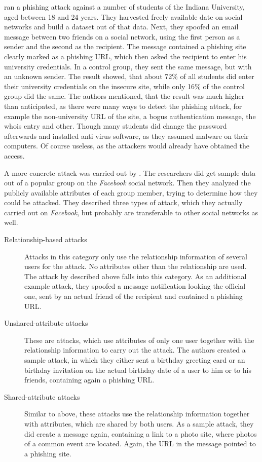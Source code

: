 \cite{jagatic2007} ran a phishing attack against a number of students of the
Indiana University, aged between 18 and 24 years. They harvested freely
available date on social networks and build a dataset out of that data. Next,
they spoofed an email message between two friends on a social network, using
the first person as a sender and the second as the recipient. The message
contained a phishing site clearly marked as a phishing URL, which then asked
the recipient to enter his university credentials. In a control group, they
sent the same message, but with an unknown sender. The result showed, that
about 72\% of all students did enter their university credentials on the
insecure site, while only 16\% of the control group did the same. The authors
mentioned, that the result was much higher than anticipated, as there were many
ways to detect the phishing attack, for example the non-university URL of the
site, a bogus authentication message, the whois entry and other. Though many
students did change the password afterwards and installed anti virus software,
as they assumed malware on their computers. Of course useless,
as the attackers would already have obtained the access.

A more concrete attack was carried out by \cite{brown2008}. The researchers
did get sample data out of a popular group on the \textit{Facebook} social network. Then
they analyzed the publicly available attributes of each group member, trying to
determine how they could be attacked. They described three types of attack,
which they actually carried out on \textit{Facebook}, but probably are transferable to
other social networks as well. 

\begin{description}
\item[Relationship-based attacks]
Attacks in this category only use the relationship information of several
users for the attack. No attributes other than the relationship are used. The
attack by \cite{jagatic2007} described above falls into this category. As an
additional example attack, they spoofed a message notification looking the
official one, sent by an actual friend of the recipient and contained a
phishing URL.

\item[Unshared-attribute attacks]
These are attacks, which use attributes of only one user together
with the relationship information to carry out the attack. The authors created
a sample attack, in which they either sent a birthday greeting card or an
birthday invitation on the actual birthday date of a user to him or to his
friends, containing again a phishing URL.

\item[Shared-attribute attacks]
Similar to above, these attacks use the relationship information together with
attributes, which are shared by both users. As a sample attack, they did create
a message again, containing a link to a photo site, where photos of a common
event are located. Again, the URL in the message pointed to a phishing site.
\end{description}

